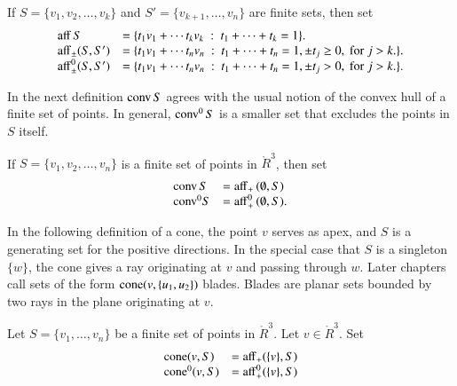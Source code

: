 \begin{definition}[affine]\label{def:aff} 
 If $S = \{v_1,v_2,\ldots,v_k\}$ 
and $S'=\{v_{k+1},\ldots,v_n\}$ are  finite sets, then
set
	$$\begin{array}{lll}
      {\operatorname{aff}}\, S &= \{t_1 v_1 +\cdots t_k v_k \ :\ 
	t_1 +\cdots+t_k = 1\}.\\
        {\operatorname{aff}}_{\pm} (S,S') &= \{t_1 v_1 +\cdots t_n v_n \ :\ 
	t_1 +\cdots+t_n = 1, \pm t_j \ge 0, \text{ for } j>k.\}.\\
        {\operatorname{aff}}^0_{\pm} (S,S') &= \{t_1 v_1 +\cdots t_n v_n \ :\ 
	t_1 +\cdots+t_n = 1, \pm t_j > 0, \text{ for } j>k.\}.\\
		\end{array}
        $$
\end{definition}


In the next definition ${\operatorname{conv}}\,S$ agrees with the usual
notion of the convex hull of a finite set of points.
In general, ${\operatorname{conv}}^0\,S$ is a smaller set that excludes
the points in $S$ itself.  


\begin{definition}  If $S = \{v_1,v_2,\ldots,v_n\}$ is a finite set
of points in $\ring{R}^3$, then
set
	$$
        \begin{array}{lll}
          {\operatorname{conv}}\, S &= {\operatorname{aff}}_+\, (\emptyset,S)\\
	   {\operatorname{conv}}^0 S &= {\operatorname{aff}}^0_+\, (\emptyset,S).\\
           \end{array}
        $$
\end{definition}

In the following definition of a cone, the point $v$ serves
as apex, and $S$ is a generating set for the positive directions.
In the special case that $S$ is a singleton $\{w\}$, 
the cone gives
a ray originating at $v$ and passing through $w$.  Later
chapters call sets of the form ${\operatorname{cone}}(v,\{u_1,u_2\})$ blades.
Blades are planar sets bounded by two rays
in the plane originating at $v$.

\begin{definition}[cone]
Let $S=\{v_1,\ldots,v_n\}$ be a finite set of points in 
$\ring{R}^3$.  Let $v\in\ring{R}^3$. Set
  $$\begin{array}{lll}
  {\operatorname{cone}}(v,S) &= {\operatorname{aff}}_+(\{v\},S)\\
  {\operatorname{cone}}^0(v,S) &= {\operatorname{aff}}^0_+(\{v\},S)\\
  \end{array}
  $$
\end{definition}


